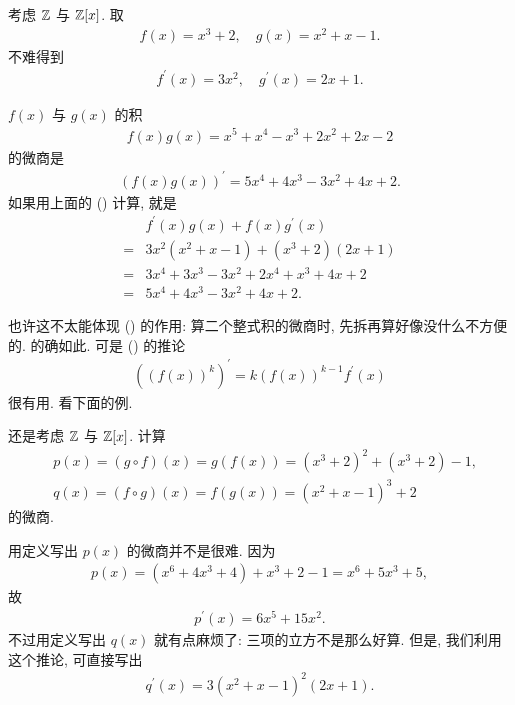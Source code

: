 \begin{example}
    考虑 $\mathbb{Z}$ 与 $\mathbb{Z}[x]$. 取
    \begin{align*}
        f(x) = x^3 + 2, \quad g(x) = x^2 + x - 1.
    \end{align*}
    不难得到
    \begin{align*}
        f^{\prime} (x) = 3x^2, \quad g^{\prime} (x) = 2x + 1.
    \end{align*}

    $f(x)$ 与 $g(x)$ 的积
    \begin{align*}
        f(x) g(x) = x^5 + x^4 - x^3 + 2x^2 + 2x - 2
    \end{align*}
    的微商是
    \begin{align*}
        (f(x) g(x))^{\prime} = 5x^4 + 4x^3 - 3x^2 + 4x + 2.
    \end{align*}
    如果用上面的 (\myStar) 计算, 就是
    \begin{align*}
             & f^{\prime} (x) g(x) + f(x) g^{\prime} (x) \\
        = {} & 3x^2 (x^2 + x - 1) + (x^3 + 2) (2x + 1)   \\
        = {} & 3x^4 + 3x^3 - 3x^2 + 2x^4 + x^3 + 4x + 2  \\
        = {} & 5x^4 + 4x^3 - 3x^2 + 4x + 2.
    \end{align*}
\end{example}

也许这不太能体现 (\myStar) 的作用: 算二个整式积的微商时, 先拆再算好像没什么不方便的. 的确如此. 可是 (\myStar) 的推论
\begin{align*}
    ((f(x))^k)^{\prime} = k(f(x))^{k-1} f^{\prime}(x)
\end{align*}
很有用. 看下面的例.

\begin{example}
    还是考虑 $\mathbb{Z}$ 与 $\mathbb{Z}[x]$. 计算
    \begin{align*}
         & p(x) = (g \circ f) (x) = g(f(x)) = (x^3 + 2)^2 + (x^3 + 2) - 1, \\
         & q(x) = (f \circ g) (x) = f(g(x)) = (x^2 + x - 1)^3 + 2
    \end{align*}
    的微商.

    用定义写出 $p(x)$ 的微商并不是很难. 因为
    \begin{align*}
        p(x) = (x^6 + 4x^3 + 4) + x^3 + 2 - 1 = x^6 + 5x^3 + 5,
    \end{align*}
    故
    \begin{align*}
        p^{\prime} (x) = 6x^5 + 15x^2.
    \end{align*}
    不过用定义写出 $q(x)$ 就有点麻烦了: 三项的立方不是那么好算. 但是, 我们利用这个推论, 可直接写出
    \begin{align*}
        q^{\prime} (x) = 3(x^2 + x - 1)^2 (2x + 1).
    \end{align*}
\end{example}

